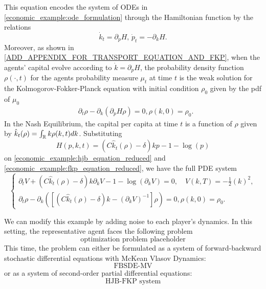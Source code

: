 This equation encodes the system of ODEs in \ref{economic_example:ode_formulation} through the Hamiltonian function by the relations
\begin{equation*}
    \dot k_t = \partial_p H,\, \dot p_t = -\partial_k H.
\end{equation*}
Moreover, as shown in \ref{ADD_APPENDIX_FOR_TRANSPORT_EQUATION_AND_FKP},
when the agents' capital evolve according to $\dot k = \partial_p H$,
the probability density function $\rho(\cdot, t)$ for the agents probability measure $\mu_t$ at time $t$
is the weak solution for the Kolmogorov-Fokker-Planck equation with initial condition $\rho_0$ given by the pdf of $\mu_0$
\begin{equation}\label{economic_example:fkp_equation_reduced}
\begin{split}
    &\partial_t \rho - \partial_k \left( \partial_p H \rho \right) = 0, \rho(k,0) = \rho_0.
\end{split}
\end{equation}
In the Nash Equilibrium, the capital per capita at time $t$ is a function of $\rho$ given by $\hat k_t(\rho) = \int_{\mathbb{R}} k \rho(k,t) dk$.
Substituting 
\begin{equation*}
    H(p,k,t) = \left(C {\hat k_t(\rho) - \delta}\right)k p  - 1  - \log(p)
\end{equation*}
on \ref{economic_example:hjb_equation_reduced} and \ref{economic_example:fkp_equation_reduced}, we have the full PDE system
\begin{equation}
    \begin{cases}
        \partial_t V +  \left(C {\hat k_t(\rho) - \delta}\right)k\partial_k V - 1  - \log(\partial_k V) = 0,\quad V(k,T) = -\frac{1}{2}(k)^2,\\
        \partial_t \rho - \partial_k \left( \left[ \left(C {\hat k_t}(\rho) - \delta\right) k - (\partial_k V)^{-1} \right]\rho \right) = 0, \rho(k,0) = \rho_0.
    \end{cases}
\end{equation}
\color{black}

We can modify this example by adding noise to each player's dynamics.
In this setting, the representative agent faces the following problem
\begin{equation}
    \text{optimization problem placeholder}
\end{equation}
This time, the problem can either be formulated as a system of 
forward-backward stochastic differential equations with McKean Vlasov Dynamics:
\begin{equation}
    \text{FBSDE-MV}
\end{equation}
or as a system of second-order partial differential equations:
\begin{equation}
    \text{HJB-FKP system}
\end{equation}

